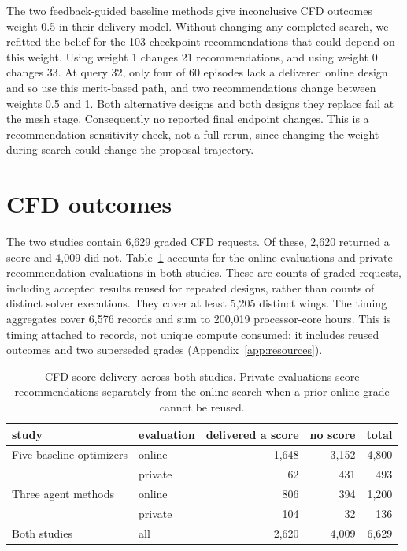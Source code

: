 \documentclass{article} %
\newcommand{\UnifiedCFDObserved}{6{,}629}
\newcommand{\CoreHoursOverall}{200{,}019}
\newcommand{\TimedEvaluationsOverall}{6{,}576}
\begin{document}
The two feedback-guided baseline methods give inconclusive CFD outcomes weight
0.5 in their delivery model. Without changing any completed search, we refitted the
belief for the 103 checkpoint recommendations that could depend on this weight.
Using weight 1 changes 21 recommendations, and using weight 0 changes 33.
At query 32, only four of 60 episodes lack a delivered online design and so
use this merit-based path, and two
recommendations change between weights 0.5 and 1. Both alternative designs and
both designs they replace fail at the mesh stage. Consequently no reported
final endpoint changes. This is a recommendation sensitivity check, not a full
rerun, since changing the weight during search could change the proposal trajectory.

\section{CFD outcomes}
\label{app:outcomes}

The two studies contain \UnifiedCFDObserved{} graded CFD requests. Of these,
2{,}620 returned a score and 4{,}009 did not. Table~\ref{tab:all-outcomes}
accounts for the online evaluations and private recommendation evaluations in
both studies. These are counts of graded requests, including accepted results
reused for repeated designs, rather than counts of distinct solver executions.
They cover at least 5{,}205 distinct wings. The timing aggregates cover
\TimedEvaluationsOverall{} records and sum to \CoreHoursOverall{}
processor-core hours. This is timing attached to records, not unique compute
consumed: it includes reused outcomes and two superseded grades
(Appendix~\ref{app:resources}).

\begin{table}[htbp]
\caption{CFD score delivery across both studies. Private evaluations score
recommendations separately from the online search when a prior online grade
cannot be reused.}
\label{tab:all-outcomes}
\centering
\scriptsize
\setlength{\tabcolsep}{5pt}
\begin{tabular*}{\textwidth}{@{\extracolsep{\fill}}llrrr}
\toprule
study & evaluation & delivered a score & no score & total \\
\midrule
Five baseline optimizers & online & 1{,}648 & 3{,}152 & 4{,}800 \\
 & private & 62 & 431 & 493 \\
Three agent methods & online & 806 & 394 & 1{,}200 \\
 & private & 104 & 32 & 136 \\
\midrule
Both studies & all & 2{,}620 & 4{,}009 & 6{,}629 \\
\bottomrule
\end{tabular*}
\end{table}
\FloatBarrier
\end{document}

